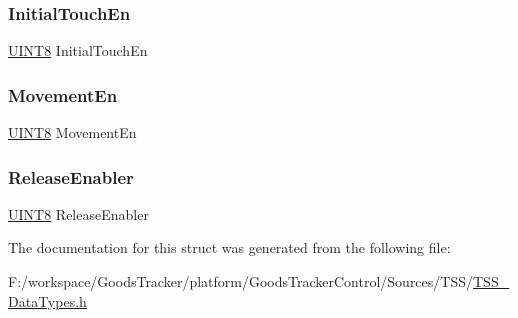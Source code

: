 \subsubsection{\texorpdfstring{Initial\+Touch\+En}{InitialTouchEn}}
{\footnotesize\ttfamily \hyperlink{_t_s_s___data_types_8h_ab27e9918b538ce9d8ca692479b375b6a}{U\+I\+N\+T8} Initial\+Touch\+En}

\mbox{\label{struct_t_s_s___s_l_i_d_e_r___e_v_e_n_t_s_a7011ab8c0efec25677b2287c886370d0}} 
\subsubsection{\texorpdfstring{Movement\+En}{MovementEn}}
{\footnotesize\ttfamily \hyperlink{_t_s_s___data_types_8h_ab27e9918b538ce9d8ca692479b375b6a}{U\+I\+N\+T8} Movement\+En}

\mbox{\label{struct_t_s_s___s_l_i_d_e_r___e_v_e_n_t_s_a7f5f3751fee0f5a199948ffb87697255}} 
\subsubsection{\texorpdfstring{Release\+Enabler}{ReleaseEnabler}}
{\footnotesize\ttfamily \hyperlink{_t_s_s___data_types_8h_ab27e9918b538ce9d8ca692479b375b6a}{U\+I\+N\+T8} Release\+Enabler}



The documentation for this struct was generated from the following file\+:\begin{DoxyCompactItemize}
\item 
F\+:/workspace/\+Goods\+Tracker/platform/\+Goods\+Tracker\+Control/\+Sources/\+T\+S\+S/\hyperlink{_t_s_s___data_types_8h}{T\+S\+S\+\_\+\+Data\+Types.\+h}\end{DoxyCompactItemize}
